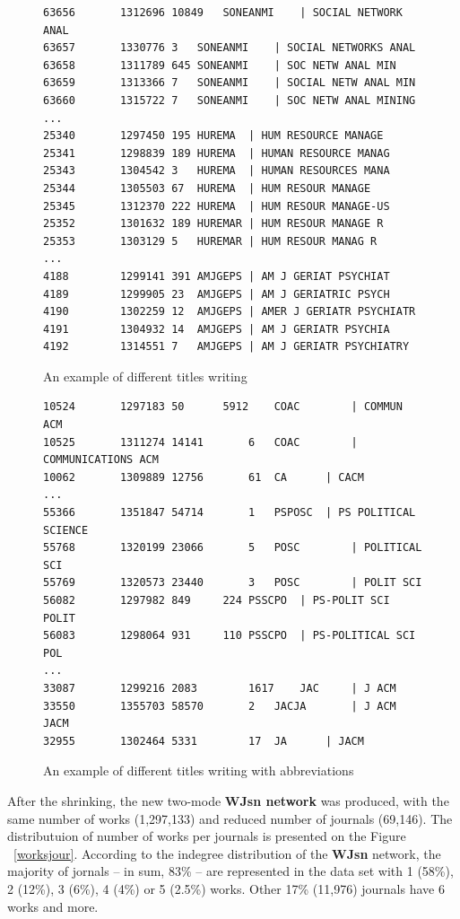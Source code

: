 \documentclass[11pt]{article} %
\begin{document}
\begin{figure}
\renewcommand{\baselinestretch}{0.8}
\scriptsize
\begin{verbatim}
63656		1312696	10849	SONEANMI	| SOCIAL NETWORK ANAL
63657		1330776	3	SONEANMI	| SOCIAL NETWORKS ANAL
63658		1311789	645	SONEANMI	| SOC NETW ANAL MIN
63659		1313366	7	SONEANMI	| SOCIAL NETW ANAL MIN
63660		1315722	7	SONEANMI	| SOC NETW ANAL MINING
...
25340		1297450	195	HUREMA	| HUM RESOURCE MANAGE
25341		1298839	189	HUREMA	| HUMAN RESOURCE MANAG
25343		1304542	3	HUREMA	| HUMAN RESOURCES MANA
25344		1305503	67	HUREMA	| HUM RESOUR MANAGE
25345		1312370	222	HUREMA	| HUM RESOUR MANAGE-US
25352		1301632	189	HUREMAR	| HUM RESOUR MANAGE R
25353		1303129	5	HUREMAR	| HUM RESOUR MANAG R
...
4188		1299141	391	AMJGEPS	| AM J GERIAT PSYCHIAT
4189		1299905	23	AMJGEPS	| AM J GERIATRIC PSYCH
4190		1302259	12	AMJGEPS	| AMER J GERIATR PSYCHIATR
4191		1304932	14	AMJGEPS	| AM J GERIATR PSYCHIA
4192		1314551	7	AMJGEPS	| AM J GERIATR PSYCHIATRY
\end{verbatim}
\caption{An example of different titles writing}\label{jour1}
\end{figure}

\begin{figure}
\renewcommand{\baselinestretch}{0.8}
\scriptsize
\begin{verbatim}
10524		1297183	50		5912	COAC		| COMMUN ACM
10525		1311274	14141		6	COAC		| COMMUNICATIONS ACM
10062		1309889	12756		61	CA		| CACM
...
55366		1351847	54714		1	PSPOSC 	| PS POLITICAL SCIENCE
55768		1320199	23066		5	POSC		| POLITICAL SCI
55769		1320573	23440		3	POSC		| POLIT SCI
56082		1297982	849		224	PSSCPO	| PS-POLIT SCI POLIT
56083		1298064	931		110	PSSCPO	| PS-POLITICAL SCI POL
...
33087		1299216	2083		1617	JAC		| J ACM
33550		1355703	58570		2	JACJA		| J ACM JACM
32955		1302464	5331		17	JA		| JACM
\end{verbatim}
\caption{An example of different titles writing with abbreviations}\label{jour2}
\end{figure}


After the shrinking, the new two-mode \textbf{WJsn network} was produced, with the same number of works (1,297,133) and reduced number of journals (69,146). The distributuion of number of works per journals is presented on the Figure ~\ref{worksjour}. According to the indegree distribution of the \textbf{WJsn} network, the majority of jornals -- in sum, 83\% -- are represented  in the data set with 1 (58\%), 2 (12\%), 3 (6\%), 4 (4\%) or 5 (2.5\%) works. Other 17\% (11,976) journals have 6 works and more. \medskip
\end{document}
